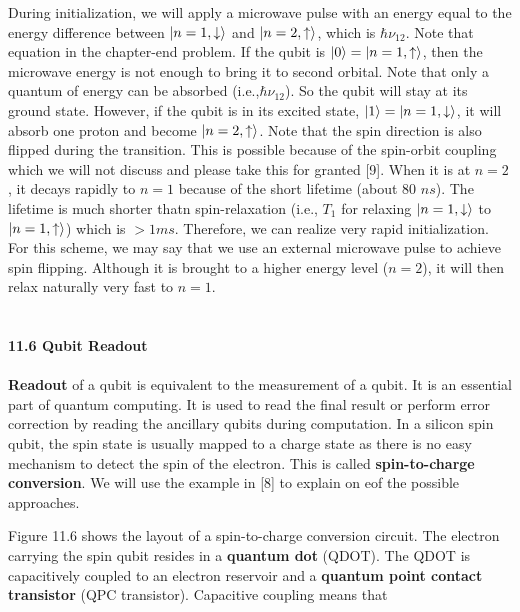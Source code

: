 \documentclass{article}
\begin{document}
During initialization, we will apply a microwave pulse with an energy equal to
the energy difference between $\ket{n=1,\downarrow}$ and $\ket{n=2,\uparrow}$, which is $\hbar \nu_{12}$.
Note that equation in the chapter-end problem. If the qubit is $\ket{0}
=\ket{n=1,\uparrow}$, then the microwave energy is not enough to bring it to 
second orbital. Note that only a quantum of energy can be absorbed (i.e.,$\hbar \nu_{12}$).
So the qubit will stay at its ground state. However, if the qubit is in its excited state, $\ket{1}=\ket{n=1,\downarrow}$,
it will absorb one proton and become $\ket{n=2,\uparrow}$. Note that the spin direction is also flipped 
during the transition. This is possible because of the spin-orbit coupling which we will not
discuss and please take this for granted [9]. When it is at $n=2$, it decays rapidly to $n=1$ because of the
short lifetime (about 80 $ns$). The lifetime is much shorter thatn spin-relaxation (i.e., $T_1$ for relaxing
$\ket{n=1,\downarrow}$ to $\ket{n=1,\uparrow}$) which is $>1 ms$. Therefore, we can realize very rapid initialization.
For this scheme, we may say that we use an external microwave pulse to achieve spin flipping. Although
it is brought to a higher energy level ($n=2$), it will then relax naturally very fast to $n=1$.\\\\\\
\textbf{\large 11.6 Qubit Readout}\\\\
\textbf{Readout} of a qubit is equivalent to the measurement of a qubit. It is an essential part of
quantum computing. It is used to read the final result or perform error correction by reading the ancillary qubits
during computation. In a silicon spin qubit, the spin state is usually mapped to a charge state as there is no easy
mechanism to detect the spin of the electron. This is called \textbf{spin-to-charge conversion}. We will use the
example in [8] to explain on eof the possible approaches.

Figure 11.6 shows the layout of a spin-to-charge conversion circuit. The electron carrying the spin qubit resides in a
\textbf{quantum dot} (QDOT). The QDOT is capacitively coupled to an electron reservoir and a \textbf{quantum point contact transistor}
(QPC transistor). Capacitive coupling means that 
\end{document}
